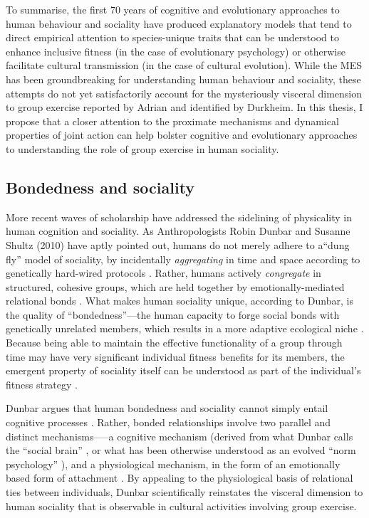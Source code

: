 \begin{CJK}{UTF8}{gbsn}
To summarise, the first 70 years of cognitive and evolutionary approaches to human behaviour and sociality have produced explanatory models that tend to direct empirical attention to species-unique traits that can be understood to enhance inclusive fitness (in the case of evolutionary psychology) or otherwise facilitate cultural transmission (in the case of cultural evolution).  While the MES has been groundbreaking for understanding human behaviour and sociality, these attempts do not yet satisfactorily account for the mysteriously visceral dimension to group exercise reported by Adrian and identified by Durkheim.  In this thesis, I propose that a closer attention to the proximate mechanisms and dynamical properties of joint action can help bolster cognitive and evolutionary approaches to understanding the role of group exercise in human sociality.



\subsection{Bondedness and sociality\label{sect:bondednessSociality}}
More recent waves of scholarship have addressed the sidelining of physicality in human cognition and sociality.  As Anthropologists Robin Dunbar and Susanne Shultz (2010) have aptly pointed out, humans do not merely adhere to a``dung fly'' model of sociality, by incidentally \textit{aggregating} in time and space according to genetically hard-wired protocols \citep[see][]{Wilson1975}.  Rather, humans actively \textit{congregate} in structured, cohesive groups, which are held together by emotionally-mediated relational bonds \citep[777]{Dunbar2010}.  What makes human sociality unique, according to Dunbar, is the quality of ``bondedness''---the human capacity to forge social bonds with genetically unrelated members, which results in a more adaptive ecological niche \citep[see][]{Odling-Smee2003}.
Because being able to maintain the effective functionality of a group through time may have very significant individual fitness benefits for its members, the emergent property of sociality itself can be understood as part of the individual's fitness strategy \citep{Dunbar2010b,Nowak2010}.

Dunbar argues that human bondedness and sociality cannot simply entail cognitive processes \citep[at least not in the way cognitive processes are narrowly rendered by game-theoretic and gene-culture coevolutionary models;][]{Dunbar2010}.  Rather, bonded relationships involve two parallel and distinct mechanisms—--a cognitive mechanism (derived from what Dunbar calls the ``social brain'' \citep{Dunbar1998}, or what has been otherwise understood as an evolved ``norm psychology'' \citep{Chudek2011}), and a physiological mechanism, in the form of an emotionally based form of attachment \citep{Dunbar2010b}.  By appealing to the physiological basis of relational ties between individuals, Dunbar scientifically reinstates the visceral dimension to human sociality that is observable in cultural activities involving group exercise.


\end{CJK}
